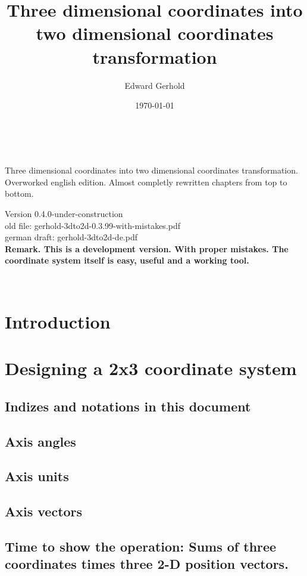 \documentclass[a4paper]{article}
\begin{document}
\begin{center}
\title{Three dimensional coordinates into two dimensional coordinates transformation}\\
\author{Edward Gerhold}
Three dimensional coordinates into two dimensional coordinates transformation.\\
Overworked english edition. Almost completly rewritten chapters from top to bottom.
\date{\today}
\maketitle

Version 0.4.0-under-construction\\
old file: gerhold-3dto2d-0.3.99-with-mistakes.pdf\\
german draft: gerhold-3dto2d-de.pdf\\

\textbf{Remark. This is a development version. With proper mistakes. The coordinate system itself is easy, useful and a working tool.}

\end{center} 

\tableofcontents\\

\section{Introduction}

\section{Designing a 2x3 coordinate system}
\subsection{Indizes and notations in this document}
\subsection{Axis angles}
\subsection{Axis units}
\subsection{Axis vectors}
\subsection{Time to show the operation: Sums of three coordinates times three 2-D position vectors.}
\end{document}
